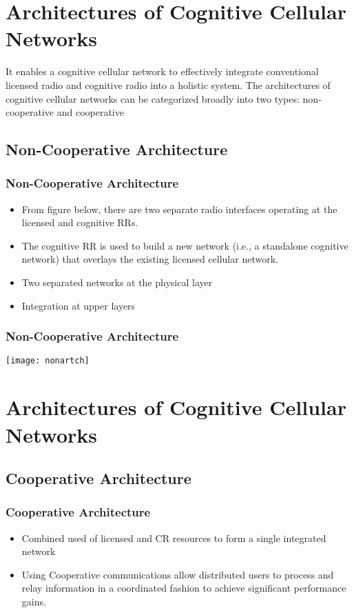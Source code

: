 \documentclass{beamer}
\begin{document}
\section{Architectures of Cognitive Cellular Networks}
\begin{frame}
It enables a cognitive cellular network to effectively integrate conventional licensed radio and cognitive radio into a holistic system. The architectures of cognitive cellular
networks can be categorized broadly into two types: non-cooperative and cooperative\end{frame}
\subsection{Non-Cooperative Architecture}
\begin{frame}
\frametitle{Non-Cooperative Architecture}
\begin{itemize}
\item From figure below, there are two separate radio interfaces operating at the licensed and cognitive RRs.
\item The cognitive RR is used to build a new network (i.e., a standalone cognitive network) that overlays the existing licensed cellular network.
\item Two separated networks at the physical layer
\item Integration at upper layers
\end{itemize}
\end{frame}
\begin{frame}
\frametitle{Non-Cooperative Architecture}
\texttt{[image: nonartch]}
\end{frame}
\section{Architectures of Cognitive Cellular Networks}
\subsection{Cooperative Architecture}
\begin{frame}
\frametitle{Cooperative Architecture}
\begin{itemize}

\item Combined used of licensed and CR resources to form a single integrated network
\item Using Cooperative communications allow distributed users to process and relay information in a coordinated fashion to achieve significant performance gains.
\end{itemize}
\end{frame}
\end{document}
